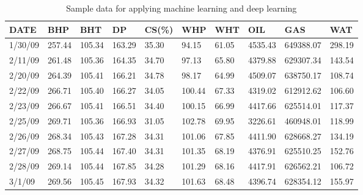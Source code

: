\documentclass[english]{article}
\begin{document}
\begin{appendices}
\begin{table}[H]
\centering
\caption{Sample data for applying machine learning and deep learning}
\begin{tabular}{@{}llllllllll@{}}
\toprule
\textbf{DATE} & \textbf{BHP} & \textbf{BHT} & \textbf{DP} & \textbf{CS(\%)} & \textbf{WHP} & \textbf{WHT} & \textbf{OIL} & \textbf{GAS} & \textbf{WAT} \\ \midrule
1/30/09       & 257.44       & 105.34       & 163.29      & 35.30           & 94.15        & 61.05        & 4535.43      & 649388.07    & 298.19       \\
2/11/09       & 261.48       & 105.36       & 164.35      & 34.70           & 97.13        & 65.80        & 4379.88      & 629307.34    & 143.54       \\
2/20/09       & 264.39       & 105.41       & 166.21      & 34.78           & 98.17        & 64.99        & 4509.07      & 638750.17    & 108.74       \\
2/22/09       & 266.71       & 105.40       & 166.27      & 34.05           & 100.44       & 67.33        & 4319.02      & 612912.62    & 106.60       \\
2/23/09       & 266.67       & 105.41       & 166.51      & 34.40           & 100.15       & 66.99        & 4417.66      & 625514.01    & 117.37       \\
2/25/09       & 269.71       & 105.36       & 166.93      & 31.05           & 102.78       & 69.95        & 3226.61      & 460948.01    & 118.99       \\
2/26/09       & 268.34       & 105.43       & 167.28      & 34.31           & 101.06       & 67.85        & 4411.90      & 628668.27    & 134.19       \\
2/27/09       & 268.75       & 105.44       & 167.40      & 34.31           & 101.35       & 68.19        & 4376.91      & 625510.25    & 152.76       \\
2/28/09       & 269.14       & 105.44       & 167.85      & 34.28           & 101.29       & 68.16        & 4417.91      & 626562.21    & 106.72       \\
3/1/09        & 269.56       & 105.45       & 167.93      & 34.32           & 101.63       & 68.48        & 4396.74      & 628354.12    & 155.97       \\

\end{tabular}
\end{table}
\end{appendices}
\end{document}
